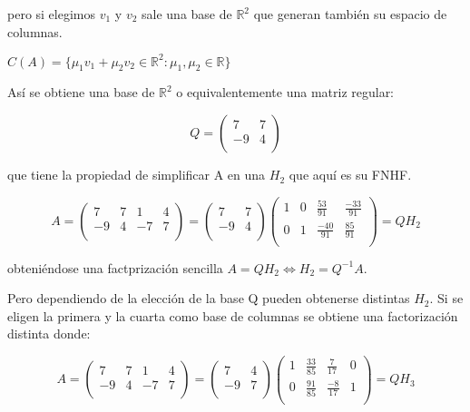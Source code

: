 \documentclass[11pt, a4paper]{article}
\newif\IfInSansMode
\newcommand{\R}{\mathbb{R}} \newcommand{\N}{\mathbb{N}}
\theoremstyle{theorem-style}
\theoremstyle{definition-style}
\theoremstyle{remark-style}
\theoremstyle{example-style}
\begin{document}
pero si elegimos $v_1$ y $v_2$ sale una base de $\R^2$ que generan también su espacio de columnas.

$C(A)= \{\mu_1v_1 + \mu_2v_2 \in \R^2: \mu_1,\mu_2 \in \R \}$

Así se obtiene una base de $\R^2$ o equivalentemente una matriz regular:

$$Q = \begin{pmatrix}
 7 & 7 \\
 -9 & 4 \\
\end{pmatrix}$$ 

que tiene la propiedad de simplificar A en una $H_2$ que aquí es su FNHF.

$$A = \begin{pmatrix}
7 & 7 & 1 & 4 \\
-9 & 4 & -7 & 7 \\
\end{pmatrix} = \begin{pmatrix}
7 & 7 \\
-9 & 4 \\
\end{pmatrix} \begin{pmatrix}
1 & 0 & \frac{53}{91} & \frac{-33}{91} \\
0 & 1 & \frac{-40}{91} & \frac{85}{91} \\
\end{pmatrix} = QH_2$$

obteniéndose una factprización sencilla $A=QH_2 \Leftrightarrow H_2=Q^{-1}A$.

Pero dependiendo de la elección de la base Q pueden obtenerse distintas $H_2$. Si se eligen la primera y la cuarta como base de columnas se obtiene una factorización distinta donde:

$$A = \begin{pmatrix}
7 & 7 & 1 & 4 \\
-9 & 4 & -7 & 7 \\
\end{pmatrix} = \begin{pmatrix}
7 & 4 \\
-9 & 7 \\
\end{pmatrix} \begin{pmatrix}
1 & \frac{33}{85} & \frac{7}{17} & 0 \\
0 & \frac{91}{85} & \frac{-8}{17} & 1 \\
\end{pmatrix} = QH_3$$
\end{document}

